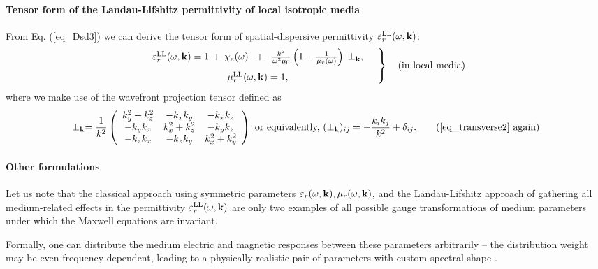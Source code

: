 \paragraph{Tensor form of the Landau-Lifshitz permittivity of local isotropic media}%
From Eq. (\ref{eq_Dsd3}) we can derive the tensor form of spatial-dispersive permittivity $\varepsilon_r^\text{LL}(\omega,{\mathbf{k}})$:
\begin{equation} 
\left.  \begin{array}{c}
\epsLL(\omega,\kk) = 1 \,+\, \chi_e(\omega) \;\;+\;\; \frac{k^2}{\omega^2 \mu_0}\left(1 - \frac{1}{\murl(\omega)}\right) \, \TT, \medskip \\
\muLL(\omega,\kk) = 1, 
\end{array} \quad \right\} \quad \text{(in local media)}
\label{eq_epsmusd3} \end{equation} 
where we make use of the wavefront projection tensor defined as
\begin{equation} \TT = \frac{1}{k^2} 
\left(\begin{array}{ccc} 
	k_y^2+k_z^2		& -k_x k_y		& -k_x k_z \\ 
	-k_y k_x		& k_x^2+k_z^2	& -k_y k_z \\ 
	-k_z k_x		& -k_z k_y		& k_x^2+k_y^2
	\end{array} \right) 
\text{ or equivalently, }
(\TT)_{ij} = - \frac{k_i k_j}{k^2} + \delta_{ij} . \tag{\ref{eq_transverse2} \again} \end{equation}

\paragraph{Other formulations}%
Let us note that the classical approach using symmetric parameters $\varepsilon_r(\omega,{\mathbf{k}}),\mu_r(\omega,{\mathbf{k}})$, and the Landau-Lifshitz approach of gathering all medium-related effects in the permittivity $\varepsilon_r^\text{LL}(\omega,{\mathbf{k}})$ are only two examples of all possible gauge transformations of medium parameters under which the Maxwell equations are invariant. 

Formally, one can distribute the medium electric and magnetic responses between these parameters arbitrarily -- the distribution weight may be even frequency dependent, leading to a physically realistic pair of parameters with custom spectral shape \cite{skaar2014diamagnetism}.

